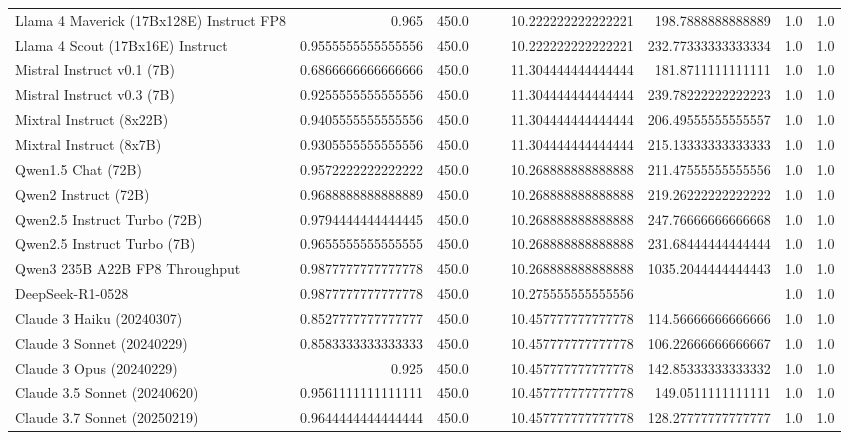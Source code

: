 \begin{table}[htp]
{\begin{tabular}{lrrrrrrrr}
Llama 4 Maverick (17Bx128E) Instruct FP8 & 0.965 & 450.0 &  &  & 10.222222222222221 & 198.7888888888889 & 1.0 & 1.0 \\
Llama 4 Scout (17Bx16E) Instruct & 0.9555555555555556 & 450.0 &  &  & 10.222222222222221 & 232.77333333333334 & 1.0 & 1.0 \\
Mistral Instruct v0.1 (7B) & 0.6866666666666666 & 450.0 &  &  & 11.304444444444444 & 181.8711111111111 & 1.0 & 1.0 \\
Mistral Instruct v0.3 (7B) & 0.9255555555555556 & 450.0 &  &  & 11.304444444444444 & 239.78222222222223 & 1.0 & 1.0 \\
Mixtral Instruct (8x22B) & 0.9405555555555556 & 450.0 &  &  & 11.304444444444444 & 206.49555555555557 & 1.0 & 1.0 \\
Mixtral Instruct (8x7B) & 0.9305555555555556 & 450.0 &  &  & 11.304444444444444 & 215.13333333333333 & 1.0 & 1.0 \\
Qwen1.5 Chat (72B) & 0.9572222222222222 & 450.0 &  &  & 10.268888888888888 & 211.47555555555556 & 1.0 & 1.0 \\
Qwen2 Instruct (72B) & 0.9688888888888889 & 450.0 &  &  & 10.268888888888888 & 219.26222222222222 & 1.0 & 1.0 \\
Qwen2.5 Instruct Turbo (72B) & 0.9794444444444445 & 450.0 &  &  & 10.268888888888888 & 247.76666666666668 & 1.0 & 1.0 \\
Qwen2.5 Instruct Turbo (7B) & 0.9655555555555555 & 450.0 &  &  & 10.268888888888888 & 231.68444444444444 & 1.0 & 1.0 \\
Qwen3 235B A22B FP8 Throughput & 0.9877777777777778 & 450.0 &  &  & 10.268888888888888 & 1035.2044444444443 & 1.0 & 1.0 \\
DeepSeek-R1-0528 & 0.9877777777777778 & 450.0 &  &  & 10.275555555555556 &  & 1.0 & 1.0 \\
Claude 3 Haiku (20240307) & 0.8527777777777777 & 450.0 &  &  & 10.457777777777778 & 114.56666666666666 & 1.0 & 1.0 \\
Claude 3 Sonnet (20240229) & 0.8583333333333333 & 450.0 &  &  & 10.457777777777778 & 106.22666666666667 & 1.0 & 1.0 \\
Claude 3 Opus (20240229) & 0.925 & 450.0 &  &  & 10.457777777777778 & 142.85333333333332 & 1.0 & 1.0 \\
Claude 3.5 Sonnet (20240620) & 0.9561111111111111 & 450.0 &  &  & 10.457777777777778 & 149.0511111111111 & 1.0 & 1.0 \\
Claude 3.7 Sonnet (20250219) & 0.9644444444444444 & 450.0 &  &  & 10.457777777777778 & 128.27777777777777 & 1.0 & 1.0 \\

\end{tabular}}
\end{table}
